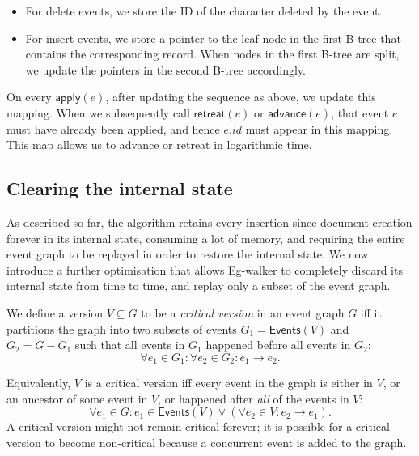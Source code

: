 \documentclass[sigplan,10pt]{acmart}
\newcommand{\algname}{Eg-walker\xspace}
\begin{document}
\begin{itemize}
\item For delete events, we store the ID of the character deleted by the event.
\item For insert events, we store a pointer to the leaf node in the first B-tree that contains the corresponding record. When nodes in the first B-tree are split, we update the pointers in the second B-tree accordingly.
\end{itemize}

On every $\mathsf{apply}(e)$, after updating the sequence as above, we update this mapping.
When we subsequently call $\mathsf{retreat}(e)$ or $\mathsf{advance}(e)$, that event $e$ must have already been applied, and hence $e.\mathit{id}$ must appear in this mapping.
This map allows us to advance or retreat in logarithmic time.

\subsection{Clearing the internal state}\label{clearing}

As described so far, the algorithm retains every insertion since document creation forever in its internal state, consuming a lot of memory, and requiring the entire event graph to be replayed in order to restore the internal state.
We now introduce a further optimisation that allows \algname to completely discard its internal state from time to time, and replay only a subset of the event graph.

We define a version $V \subseteq G$ to be a \emph{critical version} in an event graph $G$ iff it partitions the graph into two subsets of events $G_1 = \mathsf{Events}(V)$ and $G_2 = G - G_1$ such that all events in $G_1$ happened before all events in $G_2$:
\begin{equation*}
  \forall e_1 \in G_1: \forall e_2 \in G_2: e_1 \rightarrow e_2.
\end{equation*}

Equivalently, $V$ is a critical version iff every event in the graph is either in $V$, or an ancestor of some event in $V$, or happened after \emph{all} of the events in $V$:
\begin{equation*}
  \forall e_1 \in G: e_1 \in \mathsf{Events}(V) \vee (\forall e_2 \in V: e_2 \rightarrow e_1).
\end{equation*}
A critical version might not remain critical forever; it is possible for a critical version to become non-critical because a concurrent event is added to the graph.
\end{document}
